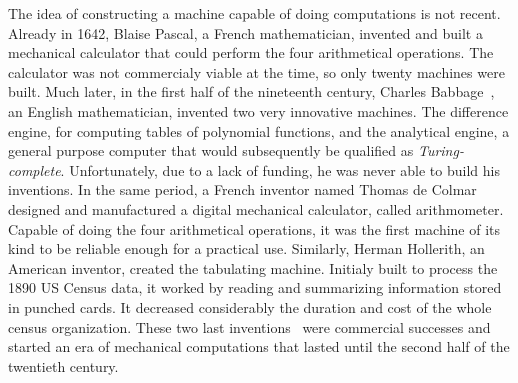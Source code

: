         The idea of constructing a machine capable of doing computations is not recent. Already in 1642, Blaise Pascal,
        a French mathematician, invented and built a mechanical calculator that could perform the four arithmetical
        operations. The calculator was not commercialy viable at the time, so only twenty machines were built. Much
        later, in the first half of the nineteenth century, Charles Babbage~\cite[Chapters~2-3]{human_computers}, an
        English mathematician, invented two very innovative machines. The difference engine, for computing tables of
        polynomial functions, and the analytical engine, a general purpose computer that would subsequently be qualified
        as \emph{Turing-complete}. Unfortunately, due to a lack of funding, he was never able to build his inventions.
        In the same period, a French inventor named Thomas de Colmar designed and manufactured a digital
        mechanical calculator, called arithmometer. Capable of doing the four arithmetical operations, it was the first
        machine of its kind to be reliable enough for a practical use.  Similarly, Herman Hollerith, an American
        inventor, created the tabulating machine. Initialy built to process the 1890 US Census data, it worked by
        reading and summarizing information stored in punched cards. It decreased considerably the duration and cost of
        the whole census organization. These two last inventions~\cite[Chapter~6]{human_computers} were commercial
        successes and started an era of mechanical computations that lasted until the second half of the twentieth
        century.



    \label{sec:exponential_growth}


